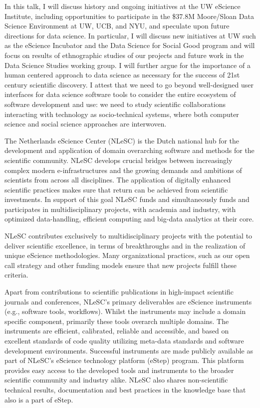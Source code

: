 \documentclass[a4paper,UKenglish]{dagrep}
\begin{document}
In this talk, I will discuss history and ongoing initiatives at the UW eScience Institute, including opportunities to participate in the \$37.8M Moore/Sloan Data Science Environment at UW, UCB, and NYU, and speculate upon future directions for data science. In particular, I will discuss new initiatives at UW such as the eScience Incubator and the Data Science for Social Good program and will focus on results of ethnographic studies of our projects and future work in the Data Science Studies working group. I will further argue for the importance of a human centered approach to data science as necessary for the success of 21st century scientific discovery. I attest that we need to go beyond well-designed user interfaces for data science software tools to consider the entire ecosystem of software development and use: we need to study scientific collaborations interacting with technology as socio-technical systems, where both computer science and social science approaches are interwoven.


The Netherlands eScience Center (NLeSC) is the Dutch national hub for
the development and application of domain overarching software and
methods for the scientific community. NLeSC develops crucial bridges
between increasingly complex modern e-infrastructures and the growing
demands and ambitions of scientists from across all disciplines. The
application of digitally enhanced scientific practices makes sure that
return can be achieved from scientific investments. In support of this
goal NLeSC funds and simultaneously funds and participates in
multidisciplinary projects, with academia and industry, with optimized
data-handling, efficient computing and big-data analytics at their
core.

NLeSC contributes exclusively to multidisciplinary projects with the
potential to deliver scientific excellence, in terms of breakthroughs
and in the realization of unique eScience methodologies. Many
organizational practices, such as our open call strategy and other
funding models ensure that new projects fulfill these criteria.

Apart from contributions to scientific publications in high-impact
scientific journals and conferences, NLeSC’s primary deliverables are
eScience instruments (e.g., software tools, workflows). Whilst the
instruments may include a domain specific component, primarily these
tools overarch multiple domains. The instruments are efficient,
calibrated, reliable and accessible, and based on excellent standards
of code quality utilizing meta-data standards and software development
environments. Successful instruments are made publicly available as
part of NLeSC’s eScience technology platform (eStep) program. This
platform provides easy access to the developed tools and instruments
to the broader scientific community and industry alike. NLeSC also
shares non-scientific technical results, documentation and best
practices in the knowledge base that also is a part of eStep.
\end{document}
